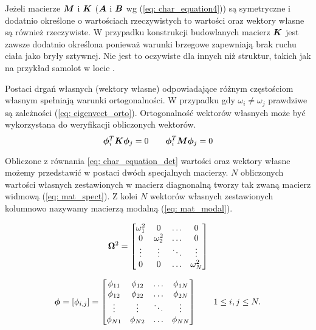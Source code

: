 Jeżeli macierze $\bm{M}$ i $\bm{K}$ ($\bm{A}$ i $\bm{B}$ wg (\ref{eq: char_equation4})) są symetryczne i dodatnio określone o wartościach rzeczywistych to wartości oraz wektory własne są również rzeczywiste. W przypadku konstrukcji budowlanych macierz $\bm{K}$ jest zawsze dodatnio określona ponieważ warunki brzegowe zapewniają brak ruchu ciała jako bryły sztywnej. Nie jest to oczywiste dla innych niż struktur, takich jak na przykład samolot w locie \parencite{Chopra2012a}.


Postaci drgań własnych (wektory własne) odpowiadające różnym częstościom własnym spełniają warunki ortogonalności. W przypadku gdy $\omega_i \neq \omega_j$ prawdziwe są zależności (\ref{eq: eigenvect_orto}). Ortogonalność wektorów własnych może być wykorzystana do weryfikacji obliczonych wektorów. 
\begin{equation} \label{eq: eigenvect_orto}
\bm{\phi}_i^{T}\bm{K\phi}_j = 0 \qquad \bm{\phi}_i^{T}\bm{M\phi}_j = 0
\end{equation}

Obliczone z równania \ref{eq: char_equation_det} wartości oraz wektory własne możemy przedstawić w postaci dwóch specjalnych macierzy. $N$ obliczonych wartości własnych zestawionych w macierz diagnonalną tworzy tak zwaną macierz widmową (\ref{eq: mat_spect}). Z kolei $N$ wektorów własnych zestawionych kolumnowo nazywamy macierzą modalną (\ref{eq: mat_modal}).

\begin{equation}  \label{eq: mat_spect}
\bm{\Omega}^2 =  
\begin{bmatrix} 
	\omega_{1}^2 & 0 			& \dots  & 0      \\ 
	0 		     & \omega_{2}^2 & \dots  & 0      \\
	\vdots       & \vdots       & \ddots & \vdots \\
	0 			 & 0 		    & \dots  & \omega_{N}^2 


\end{bmatrix}
\end{equation}

\begin{equation} \label{eq: mat_modal}
	\bm{\phi} = [\phi_{i,j}]= 
	\begin{bmatrix} 
		\phi_{11} & \phi_{12} & \dots & \phi_{1N} \\ 
		\phi_{12} & \phi_{22} & \dots & \phi_{2N} \\
		\vdots    & \vdots    & \ddots & \vdots \\
		\phi_{N1} & \phi_{N2} & \dots & \phi_{NN} 
	
	
	\end{bmatrix}
	\qquad
	1\leq i,j \leq N.
\end{equation}

